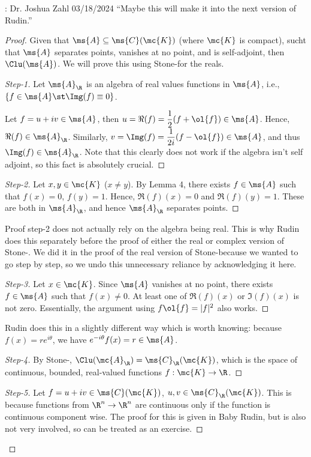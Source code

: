 \begin{nquote}{: Dr. Joshua Zahl 03/18/2024}
    ``Maybe this will make it into the next version of Rudin.''
\end{nquote}
\begin{proof}
Given that \(\ms{A}\subseteq\ms{C}(\mc{K})\) (where \(\mc{K}\) is compact), sucht that \(\ms{A}\) separates points, vanishes at no point, and is self-adjoint, then \(\Clu(\ms{A})\). We will prove this using Stone-\Weierstass for the reals.
\begin{proof}[Step-1]\let\qed\relax
    Let \(\ms{A}_{\R}\) is an algebra of real values functions in \(\ms{A}\), i.e., \(\{f\in\ms{A}\st\Img(f)\equiv 0\}\).

    \medskip

    Let \(f=u+iv\in\ms{A}\), then \(u=\Re(f)=\displaystyle\frac{1}{2}(f+\ol{f})\in\ms{A}\). Hence, \(\Re(f)\in\ms{A}_{\R}\). Similarly, \(v=\Img(f)=\displaystyle\frac{1}{2i}(f-\ol{f})\in\ms{A}\), and thus \(\Img(f)\in\ms{A}_{\R}\). Note that this clearly does not work if the algebra isn't self adjoint, so this fact is absolutely crucial.
\end{proof}
\begin{proof}[Step-2]\let\qed\relax
    Let \(x,y\in\mc{K}\) (\(x\neq y\)). By Lemma 4, there exists \(f\in\ms{A}\) such that \(f(x)=0\), \(f(y)=1\). Hence, \(\Re(f)(x)=0\) and \(\Re(f)(y)=1\). These are both in \(\ms{A}_{\R}\), and hence \(\ms{A}_{\R}\) separates points.
\end{proof}
\begin{note}
    Proof step-2 does not actually rely on the algebra being real. This is why Rudin does this separately before the proof of either the real or complex version of Stone-\Weierstass. We did it in the proof of the real version of Stone-\Weierstass because we wanted to go step by step, so we undo this unnecessary reliance by acknowledging it here.
\end{note}
\begin{proof}[Step-3]\let\qed\relax
    Let \(x\in\mc{K}\). Since \(\ms{A}\) vanishes at no point, there exists \(f\in\ms{A}\) such that \(f(x)\neq 0\). At least one of \(\Re(f)(x)\) or \(\Im(f)(x)\) is not zero. Essentially, the argument using \(f\ol{f}=|f|^2\) also works.
\end{proof}
\begin{note}
    Rudin does this in a slightly different way which is worth knowing: because \(f(x)=re^{i\theta}\), we have \(e^{-i\theta}f(x)=r\in\ms{A}\).
\end{note}
\begin{proof}[Step-4]\let\qed\relax
    By Stone-\Weierstass, \(\Clu(\mc{A}_{\R})=\ms{C}_{\R}(\mc{K})\), which is the space of continuous, bounded, real-valued functions \(f:\mc{K}\to\R\).
\end{proof}
\begin{proof}[Step-5]\let\qed\relax
    Let \(f=u+iv\in\ms{C}(\mc{K})\), \(u,v\in\ms{C}_{\R}(\mc{K})\). This is because functions from \(\R^n\to\R^n\) are continuous only if the function is continuous component wise. The proof for this is given in Baby Rudin, but is also not very involved, so can be treated as an exercise.


\end{proof}
\end{proof}
